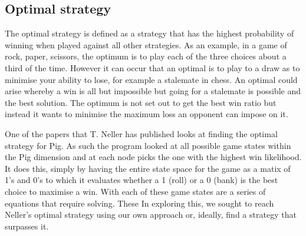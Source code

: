 \documentclass[a4paper,titlepage]{article}
\begin{document}
\subsection{Optimal strategy}

The optimal strategy is defined as a strategy that has the highest probability of winning when played against all other strategies. As an example, in a game of rock, paper, scissors, the optimum is to play each of the three choices about a third of the time. However it can occur that an optimal is to play to a draw as to minimise your ability to lose, for example a stalemate in chess. An optimal could arise whereby a win is all but impossible but going for a stalemate is possible and the best solution. The optimum is not set out to get the best win ratio but instead it wants to minimise the maximum loss an opponent can impose on it.

One of the papers that T. Neller has published looks at finding the optimal strategy for Pig. As such the program looked at all possible game states within the Pig dimension and at each node picks the one with the highest win likelihood. It does this, simply by having the entire state space for the game as a matix of 1's and 0's to which it evaluates whether a 1 (roll) or a 0 (bank) is the best choice to maximise a win. With each of these game states are a series of equations that require solving. These In exploring this, we sought to reach Neller's optimal strategy using our own approach or, ideally, find a strategy that surpasses it.
\end{document}
